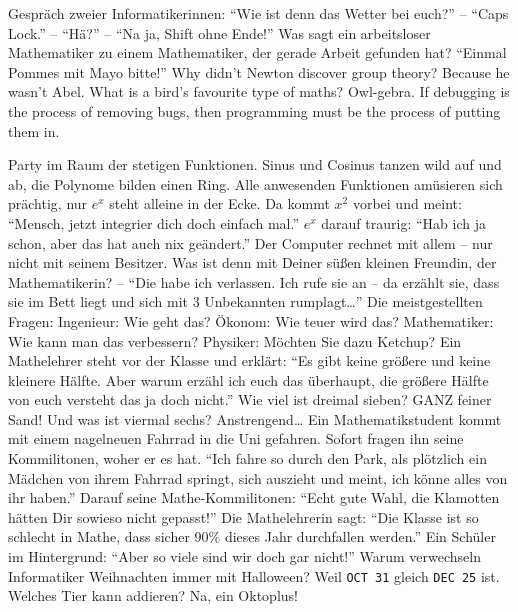 {	\or Gespräch zweier Informatikerinnen: \enquote{Wie ist denn das Wetter bei euch?} -- \enquote{Caps Lock.} -- \enquote{Hä?} -- \enquote{Na ja, Shift ohne Ende!}
	\or Was sagt ein arbeitsloser Mathematiker zu einem Mathematiker, der gerade Arbeit gefunden hat? \enquote{Einmal Pommes mit Mayo bitte!}
	\or Why didn't Newton discover group theory? Because he wasn't Abel.
	\or What is a bird's favourite type of maths? Owl-gebra.
	\or If debugging is the process of removing bugs, then programming must be the process of putting them in.
	
	\or Party im Raum der stetigen Funktionen. Sinus und Cosinus tanzen wild auf und ab, die Polynome bilden einen Ring. Alle anwesenden Funktionen amüsieren sich prächtig, nur $e^x$ steht alleine in der Ecke. Da kommt $x^2$ vorbei und meint: \enquote{Mensch, jetzt integrier dich doch einfach mal.} $e^x$ darauf traurig: \enquote{Hab ich ja schon, aber das hat auch nix geändert.}
	\or Der Computer rechnet mit allem -- nur nicht mit seinem Besitzer.
	\or Was ist denn mit Deiner süßen kleinen Freundin, der Mathematikerin? -- \enquote{Die habe ich verlassen. Ich rufe sie an -- da erzählt sie, dass sie im Bett liegt und sich mit 3 Unbekannten rumplagt…}
	\or Die meistgestellten Fragen: Ingenieur: Wie geht das? Ökonom: Wie teuer wird das? Mathematiker: Wie kann man das verbessern? Physiker: Möchten Sie dazu Ketchup?
	\or Ein Mathelehrer steht vor der Klasse und erklärt: \enquote{Es gibt keine größere und keine kleinere Hälfte. Aber warum erzähl ich euch das überhaupt, die größere Hälfte von euch versteht das ja doch nicht.}
	\or Wie viel ist dreimal sieben? GANZ feiner Sand! Und was ist viermal sechs? Anstrengend…
	\or Ein Mathematikstudent kommt mit einem nagelneuen Fahrrad in die Uni gefahren. Sofort fragen ihn seine Kommilitonen, woher er es hat. \enquote{Ich fahre so durch den Park, als plötzlich ein Mädchen von ihrem Fahrrad springt, sich auszieht und meint, ich könne alles von ihr haben.} Darauf seine Mathe-Kommilitonen: \enquote{Echt gute Wahl, die Klamotten hätten Dir sowieso nicht gepasst!}
	\or Die Mathelehrerin sagt: \enquote{Die Klasse ist so schlecht in Mathe, dass sicher 90\% dieses Jahr durchfallen werden.} Ein Schüler im Hintergrund: \enquote{Aber so viele sind wir doch gar nicht!}
	\or Warum verwechseln Informatiker Weihnachten immer mit Halloween? Weil \texttt{OCT 31} gleich \texttt{DEC 25} ist.
	\or Welches Tier kann addieren? Na, ein Oktoplus!
}
